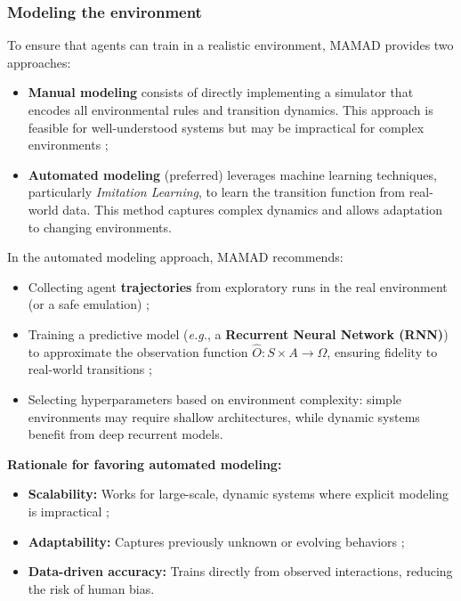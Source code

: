 \documentclass[journal]{IEEEtai}
\begin{document}
\subsubsection{Modeling the environment}
To ensure that agents can train in a realistic environment, MAMAD provides two approaches:
\begin{itemize}
    \item \textbf{Manual modeling} consists of directly implementing a simulator that encodes all environmental rules and transition dynamics. This approach is feasible for well-understood systems but may be impractical for complex environments ;
    \item \textbf{Automated modeling} (preferred) leverages machine learning techniques, particularly \textit{Imitation Learning}, to learn the transition function from real-world data. This method captures complex dynamics and allows adaptation to changing environments.
\end{itemize}

In the automated modeling approach, MAMAD recommends:
\begin{itemize}
    \item Collecting agent \textbf{trajectories} from exploratory runs in the real environment (or a safe emulation) ;
    \item Training a predictive model (\textit{e.g.}, a \textbf{Recurrent Neural Network (RNN)}) to approximate the observation function $\hat{O}: S \times A \to \Omega$, ensuring fidelity to real-world transitions ;
    \item Selecting hyperparameters based on environment complexity: simple environments may require shallow architectures, while dynamic systems benefit from deep recurrent models.
\end{itemize}

\noindent \textbf{Rationale for favoring automated modeling:}
\begin{itemize}
    \item \textbf{Scalability:} Works for large-scale, dynamic systems where explicit modeling is impractical ;
    \item \textbf{Adaptability:} Captures previously unknown or evolving behaviors ;
    \item \textbf{Data-driven accuracy:} Trains directly from observed interactions, reducing the risk of human bias.
\end{itemize}
\end{document}
